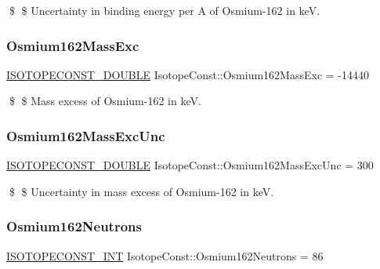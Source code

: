 \$ \$ Uncertainty in binding energy per A of Osmium-\/162 in keV. \mbox{\label{group___isotope_const-_osmium-_os162_gae27c1d51480ad42bce428b306a21cb81}} 
\subsubsection{\texorpdfstring{Osmium162\+Mass\+Exc}{Osmium162MassExc}}
{\footnotesize\ttfamily \mbox{\hyperlink{group___isotope_const-_macros_ga8f45a7272ce02c0b4c65c44636ed719a}{I\+S\+O\+T\+O\+P\+E\+C\+O\+N\+S\+T\+\_\+\+D\+O\+U\+B\+LE}} Isotope\+Const\+::\+Osmium162\+Mass\+Exc = -\/14440}

\$ \$ Mass excess of Osmium-\/162 in keV. \mbox{\label{group___isotope_const-_osmium-_os162_gafc3c700cf821637a7144fa3747b8f285}} 
\subsubsection{\texorpdfstring{Osmium162\+Mass\+Exc\+Unc}{Osmium162MassExcUnc}}
{\footnotesize\ttfamily \mbox{\hyperlink{group___isotope_const-_macros_ga8f45a7272ce02c0b4c65c44636ed719a}{I\+S\+O\+T\+O\+P\+E\+C\+O\+N\+S\+T\+\_\+\+D\+O\+U\+B\+LE}} Isotope\+Const\+::\+Osmium162\+Mass\+Exc\+Unc = 300}

\$ \$ Uncertainty in mass excess of Osmium-\/162 in keV. \mbox{\label{group___isotope_const-_osmium-_os162_ga75b91702415c1b24d58f71648edc9161}} 
\subsubsection{\texorpdfstring{Osmium162\+Neutrons}{Osmium162Neutrons}}
{\footnotesize\ttfamily \mbox{\hyperlink{group___isotope_const-_macros_ga5f18360b3e99483a35c32d789e62621c}{I\+S\+O\+T\+O\+P\+E\+C\+O\+N\+S\+T\+\_\+\+I\+NT}} Isotope\+Const\+::\+Osmium162\+Neutrons = 86}

